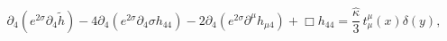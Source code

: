 \begin{equation}\label{contracted-44}
\partial_4\left(e^{2\sigma}\partial_4 \tilde h \right)
-4\partial_4\left(e^{2\sigma}\partial_4 \sigma
h_{44}\right)-2\partial_4(e^{2\sigma}\partial^{\mu}h_{\mu 4})+
\Box h_{44} = \frac{\hat \kappa}{3}\, t_{\mu}^{\mu}(x)\delta(y),
\end{equation}

